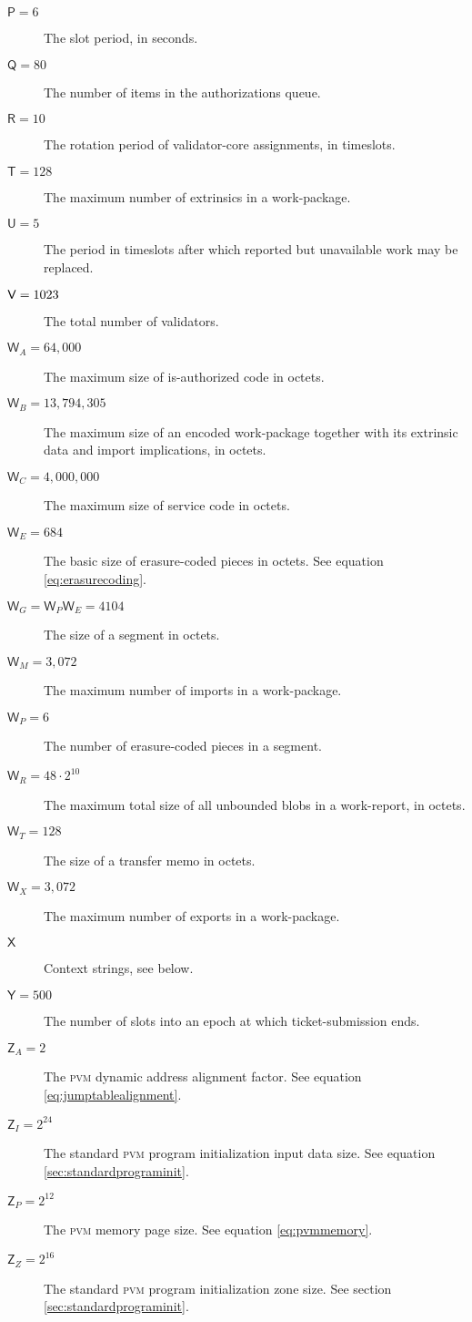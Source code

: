 \begin{description}
  \item[$\mathsf{P} = 6$] The slot period, in seconds.
  \item[$\mathsf{Q} = 80$] The number of items in the authorizations queue.
  \item[$\mathsf{R} = 10$] The rotation period of validator-core assignments, in timeslots.
  \item[$\mathsf{T} = 128$] The maximum number of extrinsics in a work-package.
  \item[$\mathsf{U} = 5$] The period in timeslots after which reported but unavailable work may be replaced.
  \item[$\mathsf{V} = 1023$] The total number of validators.
  \item[$\mathsf{W}_A = 64,000$] The maximum size of is-authorized code in octets.
  \item[$\mathsf{W}_B = 13,794,305$] The maximum size of an encoded work-package together with its extrinsic data and import implications, in octets.
  \item[$\mathsf{W}_C = 4,000,000$] The maximum size of service code in octets.
  \item[$\mathsf{W}_E = 684$] The basic size of erasure-coded pieces in octets. See equation \ref{eq:erasurecoding}.
  \item[$\mathsf{W}_G = \mathsf{W}_P\mathsf{W}_E = 4104$] The size of a segment in octets.
  \item[$\mathsf{W}_M = 3,072$] The maximum number of imports in a work-package.
  \item[$\mathsf{W}_P = 6$] The number of erasure-coded pieces in a segment.
  \item[$\mathsf{W}_R = 48\cdot2^{10}$] The maximum total size of all unbounded blobs in a work-report, in octets.
  \item[$\mathsf{W}_T = 128$] The size of a transfer memo in octets.
  \item[$\mathsf{W}_X = 3,072$] The maximum number of exports in a work-package.
  \item[$\mathsf{X}$] Context strings, see below.
  \item[$\mathsf{Y} = 500$] The number of slots into an epoch at which ticket-submission ends.
  \item[$\mathsf{Z}_A = 2$] The \textsc{pvm} dynamic address alignment factor. See equation \ref{eq:jumptablealignment}.
  \item[$\mathsf{Z}_I = 2^{24}$] The standard \textsc{pvm} program initialization input data size. See equation \ref{sec:standardprograminit}.
  \item[$\mathsf{Z}_P = 2^{12}$] The \textsc{pvm} memory page size. See equation \ref{eq:pvmmemory}.
  \item[$\mathsf{Z}_Z = 2^{16}$] The standard \textsc{pvm} program initialization zone size. See section \ref{sec:standardprograminit}.
\end{description}

